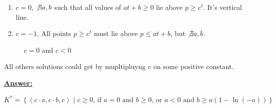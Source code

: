\begin{enumerate}
    

    \item $c = 0$, $\not \exists a, b$ such that all values of $at + b\geq 0$ lie above $p \geq e^t$. It's vertical line.

    \item $c = -1$, All points $p \geq e^t$ must lie above $p \leq at + b$, but $\not \exists a,b$.
\end{enumerate}


\begin{figure}
  \centering
    \caption{$c = 0$ and $c < 0$}
\end{figure}

All others solutions could get by mupltipluyng c on some positive constant.

\underline{\textbf{Answer:}}

\begin{equation*}
K^{*} = \left\{ (c \cdot a, c \cdot b, c) \text{ | } c\geq 0\text{, if } a = 0 \text{ and } b \geq 0 \text{, or } a < 0 \text{ and } b \geq a(1-\ln(-a)) \right\}
\end{equation*}
